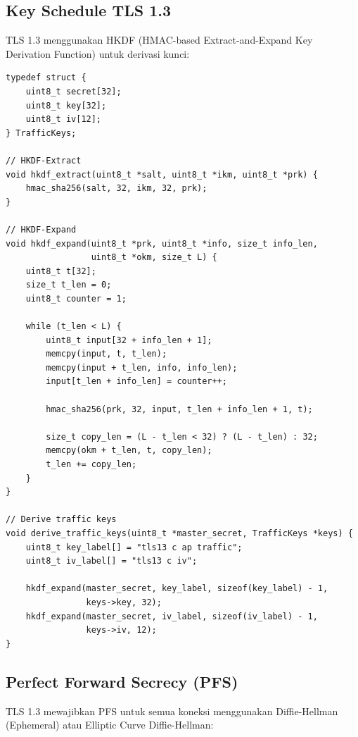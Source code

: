 \subsection{Key Schedule TLS 1.3}

TLS 1.3 menggunakan HKDF (HMAC-based Extract-and-Expand Key Derivation Function) untuk derivasi kunci:

\begin{lstlisting}[style=cstyle, caption={TLS 1.3 Key Schedule}]
typedef struct {
    uint8_t secret[32];
    uint8_t key[32];
    uint8_t iv[12];
} TrafficKeys;

// HKDF-Extract
void hkdf_extract(uint8_t *salt, uint8_t *ikm, uint8_t *prk) {
    hmac_sha256(salt, 32, ikm, 32, prk);
}

// HKDF-Expand
void hkdf_expand(uint8_t *prk, uint8_t *info, size_t info_len, 
                 uint8_t *okm, size_t L) {
    uint8_t t[32];
    size_t t_len = 0;
    uint8_t counter = 1;
    
    while (t_len < L) {
        uint8_t input[32 + info_len + 1];
        memcpy(input, t, t_len);
        memcpy(input + t_len, info, info_len);
        input[t_len + info_len] = counter++;
        
        hmac_sha256(prk, 32, input, t_len + info_len + 1, t);
        
        size_t copy_len = (L - t_len < 32) ? (L - t_len) : 32;
        memcpy(okm + t_len, t, copy_len);
        t_len += copy_len;
    }
}

// Derive traffic keys
void derive_traffic_keys(uint8_t *master_secret, TrafficKeys *keys) {
    uint8_t key_label[] = "tls13 c ap traffic";
    uint8_t iv_label[] = "tls13 c iv";
    
    hkdf_expand(master_secret, key_label, sizeof(key_label) - 1, 
                keys->key, 32);
    hkdf_expand(master_secret, iv_label, sizeof(iv_label) - 1, 
                keys->iv, 12);
}
\end{lstlisting}

\subsection{Perfect Forward Secrecy (PFS)}

TLS 1.3 mewajibkan PFS untuk semua koneksi menggunakan Diffie-Hellman (Ephemeral) atau Elliptic Curve Diffie-Hellman:

